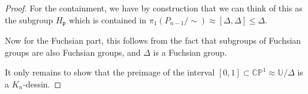 \documentclass[reqno]{amsart}
\theoremstyle{definition}
\theoremstyle{remark}
\begin{document}
\begin{proof}
        For the containment, we have by
        construction that we can think
        of this as the subgroup
        $H_{\mathfrak{p}}$ which
        is contained in
        $\pi_1 (P_{n-1}/\sim) 
        \approx \left[ \Delta, \Delta
        \right] \leq \Delta$.

        Now for the Fuchsian part, 
        this follows from the fact
        that subgroups of Fuchsian groups
        are also Fuchsian groups, and
        $\Delta$ is a Fuchsian group.

        It only remains
        to show that the preimage
        of the interval
        $\left[ 0,1 \right]
        \subset \mathbb{C}\mathbb{P}^1
        \approx \mathbb{U}/ \Delta$
        is a $K_n$-dessin.

 
    
    








    
\end{proof}



\newpage
\end{document}
